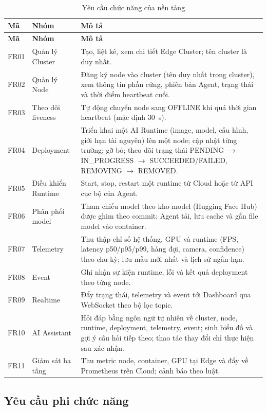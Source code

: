 \begin{longtable}{L{1.4cm}L{3.6cm}L{9.5cm}}
\caption{Yêu cầu chức năng của nền tảng}\label{tab:functional-requirements}\\
\toprule
\textbf{Mã} & \textbf{Nhóm} & \textbf{Mô tả}\\
\midrule\endfirsthead
\toprule
\textbf{Mã} & \textbf{Nhóm} & \textbf{Mô tả}\\
\midrule\endhead
FR01 & Quản lý Cluster & Tạo, liệt kê, xem chi tiết Edge Cluster; tên cluster là duy nhất.\\
FR02 & Quản lý Node & Đăng ký node vào cluster (tên duy nhất trong cluster), xem thông tin phần cứng, phiên bản Agent, trạng thái và thời điểm heartbeat cuối.\\
FR03 & Theo dõi liveness & Tự động chuyển node sang OFFLINE khi quá thời gian heartbeat (mặc định 30~s).\\
FR04 & Deployment & Triển khai một AI Runtime (image, model, cấu hình, giới hạn tài nguyên) lên một node; cập nhật từng trường; gỡ bỏ; theo dõi trạng thái PENDING $\rightarrow$ IN\_PROGRESS $\rightarrow$ SUCCEEDED/FAILED, REMOVING $\rightarrow$ REMOVED.\\
FR05 & Điều khiển Runtime & Start, stop, restart một runtime từ Cloud hoặc từ API cục bộ của Agent.\\
FR06 & Phân phối model & Tham chiếu model theo kho model (Hugging Face Hub) được ghim theo commit; Agent tải, lưu cache và gắn file model vào container.\\
FR07 & Telemetry & Thu thập chỉ số hệ thống, GPU và runtime (FPS, latency p50/p95/p99, hàng đợi, camera, confidence) theo chu kỳ; lưu mẫu mới nhất và lịch sử ngắn hạn.\\
FR08 & Event & Ghi nhận sự kiện runtime, lỗi và kết quả deployment theo từng node.\\
FR09 & Realtime & Đẩy trạng thái, telemetry và event tới Dashboard qua WebSocket theo bộ lọc topic.\\
FR10 & AI Assistant & Hỏi đáp bằng ngôn ngữ tự nhiên về cluster, node, runtime, deployment, telemetry, event; sinh biểu đồ và gợi ý câu hỏi tiếp theo; thao tác thay đổi chỉ thực hiện sau xác nhận.\\
FR11 & Giám sát hạ tầng & Thu metric node, container, GPU tại Edge và đẩy về Prometheus trên Cloud; cảnh báo theo luật.\\
\bottomrule
\end{longtable}

\subsection{Yêu cầu phi chức năng}

